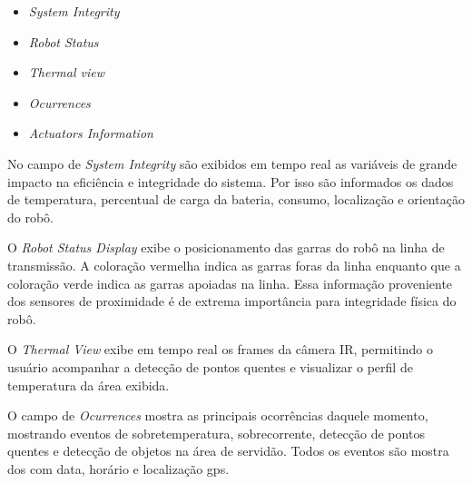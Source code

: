 \begin{itemize}
	\item \textit{System Integrity}
	\item \textit{Robot Status}
	\item \textit{Thermal view}
	\item \textit{Ocurrences}
	\item \textit{Actuators Information}
\end{itemize}

No campo de \textit{System Integrity} são exibidos em tempo real as variáveis de grande impacto na eficiência e integridade do sistema. Por isso são informados os dados de temperatura, percentual de carga da bateria, consumo, localização e orientação do robô.

O \textit{Robot Status Display} exibe o posicionamento das garras do robô na linha de transmissão. A coloração vermelha indica as garras foras da linha enquanto que a coloração verde indica as garras apoiadas na linha. Essa informação proveniente dos sensores de proximidade é de extrema importância para integridade física do robô.

O \textit{Thermal View} exibe em  tempo real os frames da câmera IR, permitindo o usuário acompanhar a detecção de pontos quentes e visualizar o perfil de temperatura da área exibida. 

O campo de \textit{Ocurrences} mostra as principais ocorrências daquele momento, mostrando eventos de sobretemperatura, sobrecorrente, detecção de pontos quentes e detecção de objetos na área de servidão. Todos os eventos são mostra
dos com data, horário e localização gps. 



